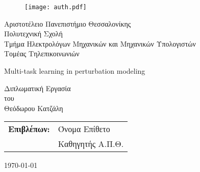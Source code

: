 \begin{titlepage}
    \begin{figure}[H]
      \begin{center}
        \texttt{[image: auth.pdf]}
        \label{fig:cover_auth_logo}
      \end{center}
    \end{figure}
    
    \centering
    \Large Αριστοτέλειο Πανεπιστήμιο Θεσσαλονίκης\\
    \Large Πολυτεχνική Σχολή\\
    \large Τμήμα Ηλεκτρολόγων Μηχανικών και Μηχανικών Υπολογιστών\\
    \large Τομέας Τηλεπικοινωνιών
    
    \vspace{\fill}
    
    \LARGE Multi-task learning in perturbation modeling
    
    \vspace{\fill}
    
    \Large Διπλωματική Εργασία\\
    \Large του\\
    \Large Θεόδωρου Κατζάλη
    
    \vspace{\fill}
    \raggedright
    
    \begin{tabular}{ll}
    \textbf{Επιβλέπων:} & Όνομα Επίθετο\\
     & Καθηγητής Α.Π.Θ.\\
    \end{tabular}
    
    \centering
    \vspace{\fill}
    \today
    
    \end{titlepage}
    
    
    
    
    
    
    
    
    \clearpage
    